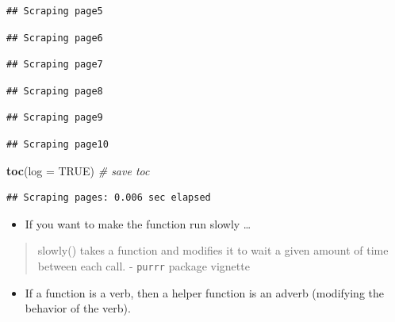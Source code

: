 \documentclass[
]{book}
\newenvironment{Shaded}{\begin{snugshade}}{\end{snugshade}}
\newcommand{\AttributeTok}[1]{\textcolor[rgb]{0.13,0.29,0.53}{#1}}
\newcommand{\CommentTok}[1]{\textcolor[rgb]{0.56,0.35,0.01}{\textit{#1}}}
\newcommand{\ConstantTok}[1]{\textcolor[rgb]{0.56,0.35,0.01}{#1}}
\newcommand{\FunctionTok}[1]{\textcolor[rgb]{0.13,0.29,0.53}{\textbf{#1}}}
\newcommand{\NormalTok}[1]{#1}
\providecommand{\tightlist}{%
  \setlength{\itemsep}{0pt}\setlength{\parskip}{0pt}}
\begin{document}
\begin{verbatim}
## Scraping page5
\end{verbatim}

\begin{verbatim}
## Scraping page6
\end{verbatim}

\begin{verbatim}
## Scraping page7
\end{verbatim}

\begin{verbatim}
## Scraping page8
\end{verbatim}

\begin{verbatim}
## Scraping page9
\end{verbatim}

\begin{verbatim}
## Scraping page10
\end{verbatim}

\begin{Shaded}
\begin{Highlighting}[]
\FunctionTok{toc}\NormalTok{(}\AttributeTok{log =} \ConstantTok{TRUE}\NormalTok{) }\CommentTok{\# save toc }
\end{Highlighting}
\end{Shaded}

\begin{verbatim}
## Scraping pages: 0.006 sec elapsed
\end{verbatim}

\begin{itemize}
\tightlist
\item
  If you want to make the function run slowly \ldots{}
\end{itemize}

\begin{quote}
slowly() takes a function and modifies it to wait a given amount of time between each call. - \texttt{purrr} package vignette
\end{quote}

\begin{itemize}
\tightlist
\item
  If a function is a verb, then a helper function is an adverb (modifying the behavior of the verb).
\end{itemize}
\end{document}
